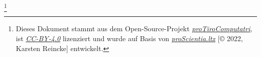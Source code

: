 %
\footnote{Dieses Dokument stammt aus dem Open-Source-Projekt
\textit{\href{https://github.com/kreincke/proTiroComputatri}{proTiroComputatri}},
ist \textit{\href{https://creativecommons.org/licenses/by/4.0/}{CC-BY-4.0}} lizenziert 
und wurde auf Basis von \textit{\href{https://github.com/kreincke/proScientia.ltx}{proScientia.ltx}} 
[\copyright{} 2022, Karsten Reincke] entwickelt.}
